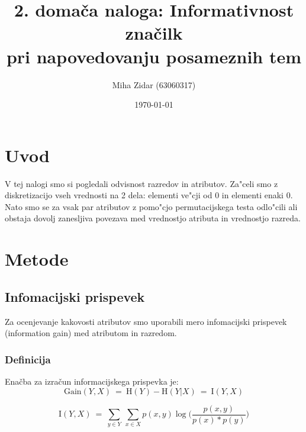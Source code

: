 \documentclass[a4paper,11pt]{article}
\title{2. domača naloga: Informativnost značilk\\pri napovedovanju posameznih tem}
\author{Miha Zidar (63060317)}
\date{\today}
\begin{document}
\maketitle

\section{Uvod}

V tej nalogi smo si pogledali odvisnost razredov in atributov. Za"celi smo z diskretizacijo vseh vrednosti na 2 dela: elementi ve"cji od 0 in elementi enaki 0. Nato smo se za vsak par atributov z pomo"cjo permutacijskega testa odlo"cili ali obstaja dovolj zanesljiva povezava med vrednostjo atributa in vrednostjo razreda. 

\section{Metode}
\subsection{Infomacijski prispevek}
Za ocenjevanje kakovosti atributov smo uporabili mero infomacijski prispevek (information gain) med atributom in razredom. 

\subsubsection*{Definicija}
Enačba za izračun informacijskega prispevka je:
\[\mbox{Gain}(Y,X)\ =\ \mbox{H}(Y) - \mbox{H}(Y|X)\ =\ \mbox{I}(Y,X)\]

\[\mbox{I}(Y,X)\ =\ \sum_{y\in Y}\ \sum_{x\in X} p(x,y) \log \Bigg(\frac{p(x,y)}{p(x)*p(y)}\Bigg) \]
\end{document}
